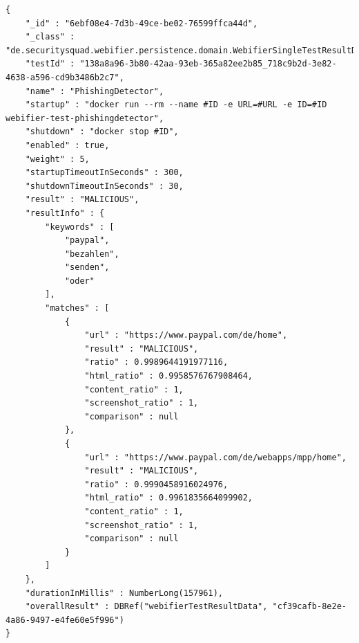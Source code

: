 \newpage

\begin{scriptsize}
\begin{lstlisting}
{
    "_id" : "6ebf08e4-7d3b-49ce-be02-76599ffca44d",
    "_class" : "de.securitysquad.webifier.persistence.domain.WebifierSingleTestResultData",
    "testId" : "138a8a96-3b80-42aa-93eb-365a82ee2b85_718c9b2d-3e82-4638-a596-cd9b3486b2c7",
    "name" : "PhishingDetector",
    "startup" : "docker run --rm --name #ID -e URL=#URL -e ID=#ID webifier-test-phishingdetector",
    "shutdown" : "docker stop #ID",
    "enabled" : true,
    "weight" : 5,
    "startupTimeoutInSeconds" : 300,
    "shutdownTimeoutInSeconds" : 30,
    "result" : "MALICIOUS",
    "resultInfo" : {
        "keywords" : [
            "paypal",
            "bezahlen",
            "senden",
            "oder"
        ],
        "matches" : [
            {
                "url" : "https://www.paypal.com/de/home",
                "result" : "MALICIOUS",
                "ratio" : 0.9989644191977116,
                "html_ratio" : 0.9958576767908464,
                "content_ratio" : 1,
                "screenshot_ratio" : 1,
                "comparison" : null
            },
            {
                "url" : "https://www.paypal.com/de/webapps/mpp/home",
                "result" : "MALICIOUS",
                "ratio" : 0.9990458916024976,
                "html_ratio" : 0.9961835664099902,
                "content_ratio" : 1,
                "screenshot_ratio" : 1,
                "comparison" : null
            }
        ]
    },
    "durationInMillis" : NumberLong(157961),
    "overallResult" : DBRef("webifierTestResultData", "cf39cafb-8e2e-4a86-9497-e4fe60e5f996")
}

\end{lstlisting}
\end{scriptsize}

